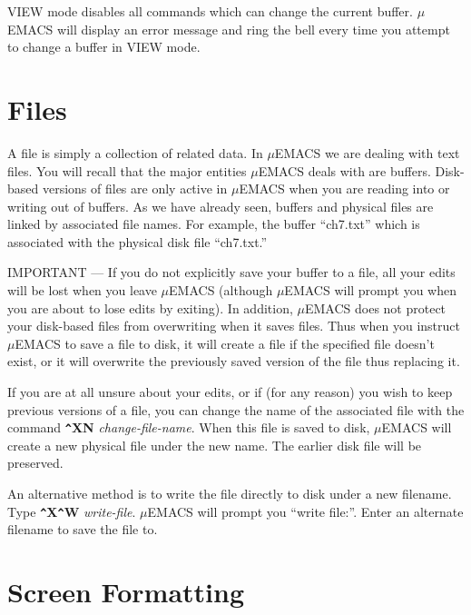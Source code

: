 VIEW mode disables all commands which can change the current buffer.
$\mu$EMACS will display an error message and ring the bell every time you
attempt to change a buffer in VIEW mode.
\chapter{Files}

A file is simply a collection of related data. In $\mu$EMACS we are
dealing with text files. You will recall that the major entities
$\mu$EMACS deals with are buffers. Disk-based versions of files are
only active in $\mu$EMACS when you are reading into or writing out of
buffers. As we have already seen, buffers and physical files are linked
by associated file names. For example, the buffer ``ch7.txt'' which is
associated with the physical disk file ``ch7.txt.''

IMPORTANT --- If you do not explicitly save your buffer to a file, all
your edits will be lost when you leave $\mu$EMACS (although $\mu$EMACS will
prompt you when you are about to lose edits by exiting). In addition,
$\mu$EMACS does not protect your disk-based files from overwriting when it
saves files. Thus when you instruct $\mu$EMACS to save a file to disk, it
will create a file if the specified file doesn't exist, or it will
overwrite the previously saved version of the file thus replacing it.

If you are at all unsure about your edits, or if (for any reason) you
wish to keep previous versions of a file, you can change the name of
the associated file with the command {\bf \verb+^+XN} {\it
change-file-name}. When this file is saved to disk, $\mu$EMACS will
create a new physical file under the new name. The earlier disk file
will be preserved.

An alternative method is to write the file directly to disk under a new
filename. Type {\bf \verb+^+X\verb+^+W} {\it write-file}. $\mu$EMACS
will prompt you ``write file:''. Enter an alternate filename to save
the file to.

\chapter{Screen Formatting}
